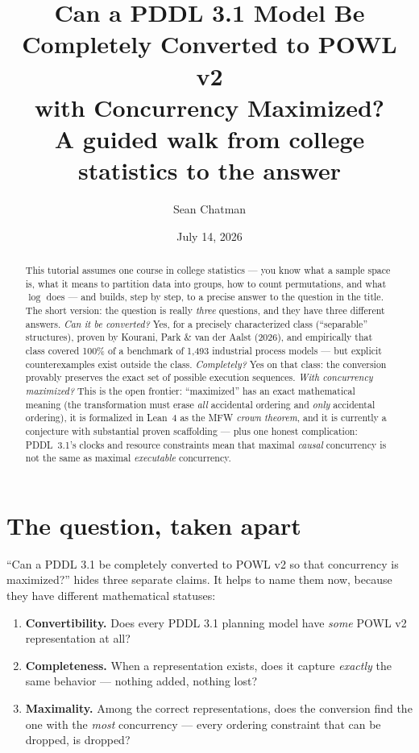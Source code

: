 \documentclass[11pt]{article}
\title{Can a PDDL 3.1 Model Be Completely Converted to POWL v2\\
with Concurrency Maximized?\\[0.5em]
\large A guided walk from college statistics to the answer}
\author{Sean Chatman}
\date{July 14, 2026}
\theoremstyle{definition}
\theoremstyle{plain}
\theoremstyle{remark}
\begin{document}
\maketitle

\begin{abstract}
\noindent This tutorial assumes one course in college statistics --- you know
what a sample space is, what it means to partition data into groups, how to
count permutations, and what $\log$ does --- and builds, step by step, to a
precise answer to the question in the title. The short version: the question
is really \emph{three} questions, and they have three different answers.
\emph{Can it be converted?} Yes, for a precisely characterized class
(``separable'' structures), proven by Kourani, Park \& van der Aalst (2026),
and empirically that class covered 100\% of a benchmark of 1{,}493 industrial
process models --- but explicit counterexamples exist outside the class.
\emph{Completely?} Yes on that class: the conversion provably preserves the
exact set of possible execution sequences. \emph{With concurrency maximized?}
This is the open frontier: ``maximized'' has an exact mathematical meaning
(the transformation must erase \emph{all} accidental ordering and \emph{only}
accidental ordering), it is formalized in Lean~4 as the MFW \emph{crown
theorem}, and it is currently a conjecture with substantial proven
scaffolding --- plus one honest complication: PDDL~3.1's clocks and resource
constraints mean that maximal \emph{causal} concurrency is not the same as
maximal \emph{executable} concurrency.
\end{abstract}

\tableofcontents

\section{The question, taken apart}

``Can a PDDL 3.1 be completely converted to POWL v2 so that concurrency is
maximized?'' hides three separate claims. It helps to name them now, because
they have different mathematical statuses:

\begin{enumerate}[label=\textbf{Q\arabic*.}]
  \item \textbf{Convertibility.} Does every PDDL 3.1 planning model have
  \emph{some} POWL v2 representation at all?
  \item \textbf{Completeness.} When a representation exists, does it capture
  \emph{exactly} the same behavior --- nothing added, nothing lost?
  \item \textbf{Maximality.} Among the correct representations, does the
  conversion find the one with the \emph{most} concurrency --- every ordering
  constraint that can be dropped, is dropped?
\end{enumerate}
\end{document}
